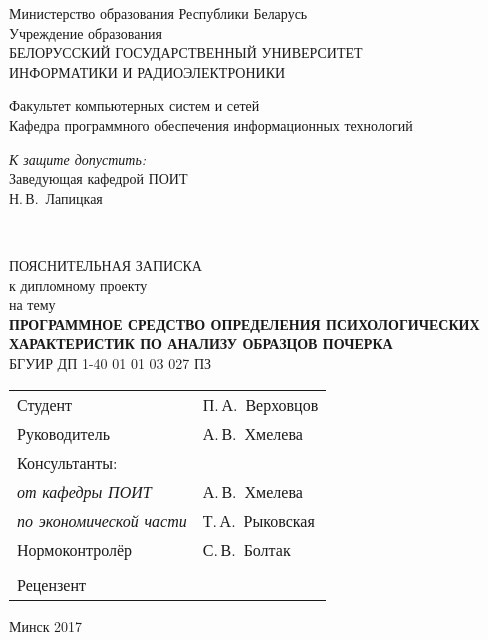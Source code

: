 \begin{titlepage}
  \begin{center}
    Министерство образования Республики Беларусь\\[1em]
    Учреждение образования\\
    БЕЛОРУССКИЙ ГОСУДАРСТВЕННЫЙ УНИВЕРСИТЕТ \\
    ИНФОРМАТИКИ И РАДИОЭЛЕКТРОНИКИ\\[1em]

    \begin{flushleft}
        Факультет компьютерных систем и сетей\\
        Кафедра программного обеспечения информационных технологий
    \end{flushleft}

    \begin{flushright}
      \begin{minipage}{0.4\textwidth}
        \textit{К защите допустить:}\\[0.8 em]
        Заведующая кафедрой ПОИТ\\[0.45 em]
        \underline{\hspace*{2.8 cm}} Н.\,В.~Лапицкая
      \end{minipage}\\[2.2 em]
    \end{flushright}

    {ПОЯСНИТЕЛЬНАЯ ЗАПИСКА}\\
    {к дипломному проекту}\\
    {на тему}\\[1em]
    \textbf{ПРОГРАММНОЕ СРЕДСТВО ОПРЕДЕЛЕНИЯ ПСИХОЛОГИЧЕСКИХ ХАРАКТЕРИСТИК ПО АНАЛИЗУ ОБРАЗЦОВ ПОЧЕРКА}\\[1em]


    {БГУИР ДП 1-40 01 01 03 027 ПЗ}\\[2em]

    \begin{tabular}{ p{}p{} }
      Студент & П.\,А.~Верховцов \\
      Руководитель & А.\,В.~Хмелева \\
      Консультанты: &\\
      \hspace*{3 ex}\emph{от кафедры ПОИТ} & А.\,В.~Хмелева \\
      \hspace*{3 ex}\emph{по экономической части} & Т.\,А.~Рыковская \\
      Нормоконтролёр & С.\,В.~Болтак\\
      & \\
      Рецензент &
    \end{tabular}

    \vfill
    {\normalsize Минск 2017}
  \end{center}
\end{titlepage}
